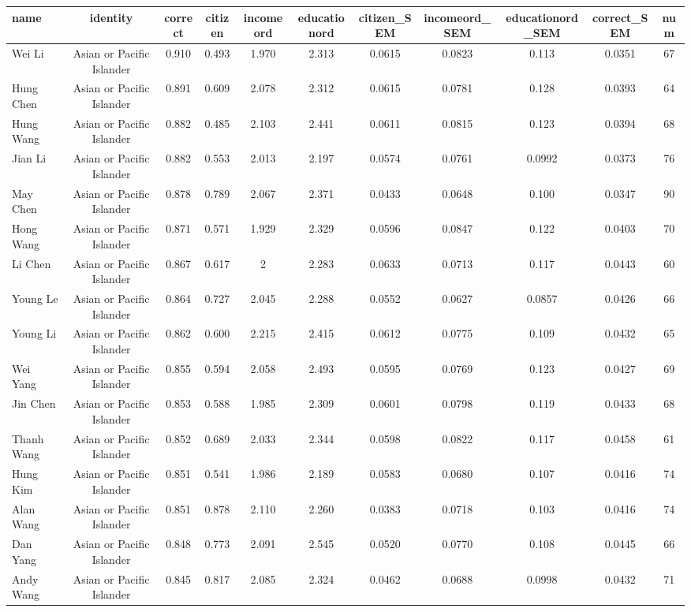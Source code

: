\documentclass[]{article}
\begin{document}
\begin{tabular}{lcccccccccc} \hline
name & identity & correct & citizen & incomeord & educationord & citizen\_SEM & incomeord\_SEM & educationord\_SEM & correct\_SEM & num \\ \hline
Wei Li & Asian or Pacific Islander & 0.910 & 0.493 & 1.970 & 2.313 & 0.0615 & 0.0823 & 0.113 & 0.0351 & 67 \\
Hung Chen & Asian or Pacific Islander & 0.891 & 0.609 & 2.078 & 2.312 & 0.0615 & 0.0781 & 0.128 & 0.0393 & 64 \\
Hung Wang & Asian or Pacific Islander & 0.882 & 0.485 & 2.103 & 2.441 & 0.0611 & 0.0815 & 0.123 & 0.0394 & 68 \\
Jian Li & Asian or Pacific Islander & 0.882 & 0.553 & 2.013 & 2.197 & 0.0574 & 0.0761 & 0.0992 & 0.0373 & 76 \\
May Chen & Asian or Pacific Islander & 0.878 & 0.789 & 2.067 & 2.371 & 0.0433 & 0.0648 & 0.100 & 0.0347 & 90 \\
Hong Wang & Asian or Pacific Islander & 0.871 & 0.571 & 1.929 & 2.329 & 0.0596 & 0.0847 & 0.122 & 0.0403 & 70 \\
Li Chen & Asian or Pacific Islander & 0.867 & 0.617 & 2 & 2.283 & 0.0633 & 0.0713 & 0.117 & 0.0443 & 60 \\
Young Le & Asian or Pacific Islander & 0.864 & 0.727 & 2.045 & 2.288 & 0.0552 & 0.0627 & 0.0857 & 0.0426 & 66 \\
Young Li & Asian or Pacific Islander & 0.862 & 0.600 & 2.215 & 2.415 & 0.0612 & 0.0775 & 0.109 & 0.0432 & 65 \\
Wei Yang & Asian or Pacific Islander & 0.855 & 0.594 & 2.058 & 2.493 & 0.0595 & 0.0769 & 0.123 & 0.0427 & 69 \\
Jin Chen & Asian or Pacific Islander & 0.853 & 0.588 & 1.985 & 2.309 & 0.0601 & 0.0798 & 0.119 & 0.0433 & 68 \\
Thanh Wang & Asian or Pacific Islander & 0.852 & 0.689 & 2.033 & 2.344 & 0.0598 & 0.0822 & 0.117 & 0.0458 & 61 \\
Hung Kim & Asian or Pacific Islander & 0.851 & 0.541 & 1.986 & 2.189 & 0.0583 & 0.0680 & 0.107 & 0.0416 & 74 \\
Alan Wang & Asian or Pacific Islander & 0.851 & 0.878 & 2.110 & 2.260 & 0.0383 & 0.0718 & 0.103 & 0.0416 & 74 \\
Dan Yang & Asian or Pacific Islander & 0.848 & 0.773 & 2.091 & 2.545 & 0.0520 & 0.0770 & 0.108 & 0.0445 & 66 \\
Andy Wang & Asian or Pacific Islander & 0.845 & 0.817 & 2.085 & 2.324 & 0.0462 & 0.0688 & 0.0998 & 0.0432 & 71 \\

\end{tabular}
\end{document}
